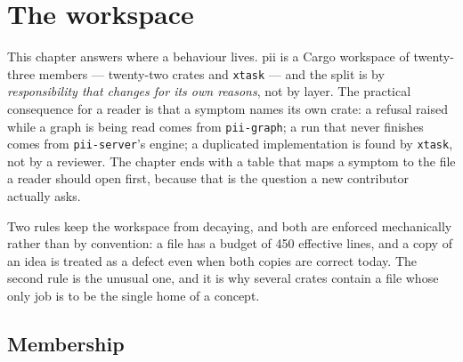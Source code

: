 \chapter{The workspace}

\label{ch:workspace}

This chapter answers where a behaviour lives. pii is a Cargo workspace of twenty-three members ---
twenty-two crates and \texttt{xtask} --- and the split is by \emph{responsibility that changes for
its own reasons}, not by layer. The practical consequence for a reader is that a symptom names its
own crate: a refusal raised while a graph is being read comes from \texttt{pii-graph}; a run that
never finishes comes from \texttt{pii-server}'s engine; a duplicated implementation is found by
\texttt{xtask}, not by a reviewer. The chapter ends with a table that maps a symptom to the file a
reader should open first, because that is the question a new contributor actually asks.

Two rules keep the workspace from decaying, and both are enforced mechanically rather than by
convention: a file has a budget of 450 effective lines, and a copy of an idea is treated as a
defect even when both copies are correct today. The second rule is the unusual one, and it is why
several crates contain a file whose only job is to be the single home of a concept.

\section{Membership}

